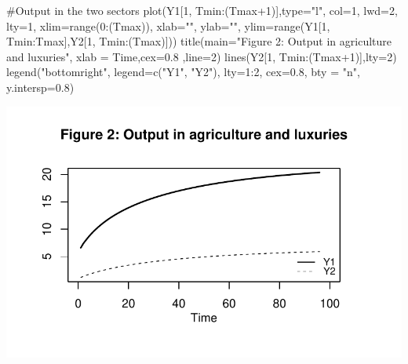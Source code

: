 \documentclass[
  letterpaper,
  DIV=11,
  numbers=noendperiod]{scrreprt}
\newenvironment{Shaded}{\begin{snugshade}}{\end{snugshade}}
\newcommand{\AttributeTok}[1]{\textcolor[rgb]{0.40,0.45,0.13}{#1}}
\newcommand{\CommentTok}[1]{\textcolor[rgb]{0.37,0.37,0.37}{#1}}
\newcommand{\DecValTok}[1]{\textcolor[rgb]{0.68,0.00,0.00}{#1}}
\newcommand{\FloatTok}[1]{\textcolor[rgb]{0.68,0.00,0.00}{#1}}
\newcommand{\FunctionTok}[1]{\textcolor[rgb]{0.28,0.35,0.67}{#1}}
\newcommand{\NormalTok}[1]{\textcolor[rgb]{0.00,0.23,0.31}{#1}}
\newcommand{\SpecialCharTok}[1]{\textcolor[rgb]{0.37,0.37,0.37}{#1}}
\newcommand{\StringTok}[1]{\textcolor[rgb]{0.13,0.47,0.30}{#1}}
\begin{document}
\begin{Shaded}
\begin{Highlighting}[]
\CommentTok{\#Output in the two sectors}
\FunctionTok{plot}\NormalTok{(Y1[}\DecValTok{1}\NormalTok{, Tmin}\SpecialCharTok{:}\NormalTok{(Tmax}\SpecialCharTok{+}\DecValTok{1}\NormalTok{)],}\AttributeTok{type=}\StringTok{"l"}\NormalTok{, }\AttributeTok{col=}\DecValTok{1}\NormalTok{, }\AttributeTok{lwd=}\DecValTok{2}\NormalTok{, }\AttributeTok{lty=}\DecValTok{1}\NormalTok{, }\AttributeTok{xlim=}\FunctionTok{range}\NormalTok{(}\DecValTok{0}\SpecialCharTok{:}\NormalTok{(Tmax)), }\AttributeTok{xlab=}\StringTok{""}\NormalTok{, }\AttributeTok{ylab=}\StringTok{""}\NormalTok{, }\AttributeTok{ylim=}\FunctionTok{range}\NormalTok{(Y1[}\DecValTok{1}\NormalTok{, Tmin}\SpecialCharTok{:}\NormalTok{Tmax],Y2[}\DecValTok{1}\NormalTok{, Tmin}\SpecialCharTok{:}\NormalTok{(Tmax)])) }
\FunctionTok{title}\NormalTok{(}\AttributeTok{main=}\StringTok{"Figure 2: Output in agriculture and luxuries"}\NormalTok{, }\AttributeTok{xlab =} \StringTok{\textquotesingle{}Time\textquotesingle{}}\NormalTok{,}\AttributeTok{cex=}\FloatTok{0.8}\NormalTok{ ,}\AttributeTok{line=}\DecValTok{2}\NormalTok{)}
\FunctionTok{lines}\NormalTok{(Y2[}\DecValTok{1}\NormalTok{, Tmin}\SpecialCharTok{:}\NormalTok{(Tmax}\SpecialCharTok{+}\DecValTok{1}\NormalTok{)],}\AttributeTok{lty=}\DecValTok{2}\NormalTok{)}
\FunctionTok{legend}\NormalTok{(}\StringTok{"bottomright"}\NormalTok{, }\AttributeTok{legend=}\FunctionTok{c}\NormalTok{(}\StringTok{"Y1"}\NormalTok{, }\StringTok{"Y2"}\NormalTok{),}
       \AttributeTok{lty=}\DecValTok{1}\SpecialCharTok{:}\DecValTok{2}\NormalTok{, }\AttributeTok{cex=}\FloatTok{0.8}\NormalTok{, }\AttributeTok{bty =} \StringTok{"n"}\NormalTok{, }\AttributeTok{y.intersp=}\FloatTok{0.8}\NormalTok{)}
\end{Highlighting}
\end{Shaded}

\includegraphics{a_ricardian_two_sector_model_files/figure-pdf/ricardo2_2-2.pdf}
\end{document}
